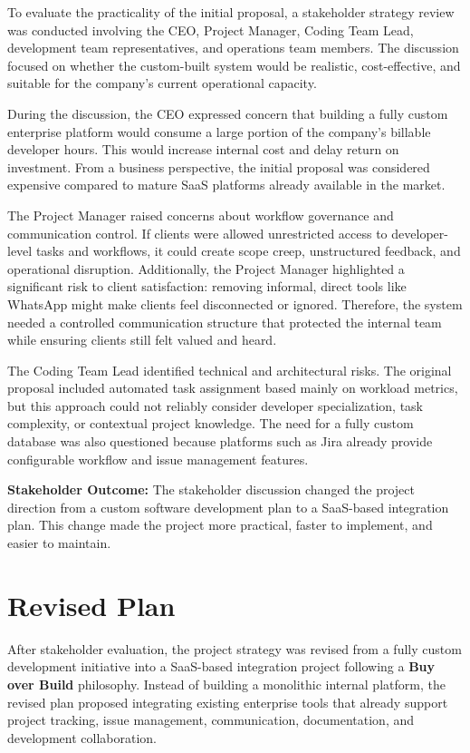 \documentclass[12pt,a4paper]{report}
\begin{document}
To evaluate the practicality of the initial proposal, a stakeholder strategy review was conducted involving the CEO, Project Manager, Coding Team Lead, development team representatives, and operations team members. The discussion focused on whether the custom-built system would be realistic, cost-effective, and suitable for the company’s current operational capacity.

During the discussion, the CEO expressed concern that building a fully custom enterprise platform would consume a large portion of the company’s billable developer hours. This would increase internal cost and delay return on investment. From a business perspective, the initial proposal was considered expensive compared to mature SaaS platforms already available in the market.

The Project Manager raised concerns about workflow governance and communication control. If clients were allowed unrestricted access to developer-level tasks and workflows, it could create scope creep, unstructured feedback, and operational disruption. Additionally, the Project Manager highlighted a significant risk to client satisfaction: removing informal, direct tools like WhatsApp might make clients feel disconnected or ignored. Therefore, the system needed a controlled communication structure that protected the internal team while ensuring clients still felt valued and heard.

The Coding Team Lead identified technical and architectural risks. The original proposal included automated task assignment based mainly on workload metrics, but this approach could not reliably consider developer specialization, task complexity, or contextual project knowledge. The need for a fully custom database was also questioned because platforms such as Jira already provide configurable workflow and issue management features.

\begin{noteBox}
\textbf{Stakeholder Outcome:} The stakeholder discussion changed the project direction from a custom software development plan to a SaaS-based integration plan. This change made the project more practical, faster to implement, and easier to maintain.
\end{noteBox}

\section{Revised Plan}

After stakeholder evaluation, the project strategy was revised from a fully custom development initiative into a SaaS-based integration project following a \textbf{Buy over Build} philosophy. Instead of building a monolithic internal platform, the revised plan proposed integrating existing enterprise tools that already support project tracking, issue management, communication, documentation, and development collaboration.
\end{document}
